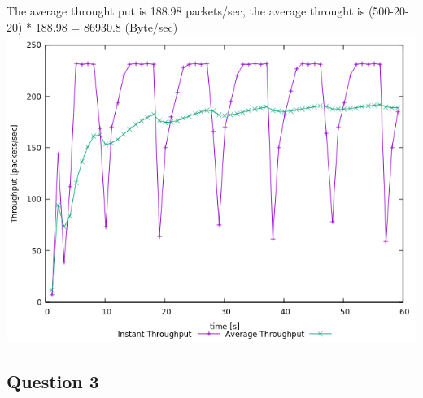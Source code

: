 \documentclass{article}
\begin{document}
The average throught put is 188.98 packets/sec, the average throught is (500-20-20) * 188.98 = 86930.8 (Byte/sec) \\
\includegraphics[width=\textwidth]{ex1q2.png}

\subsection{Question 3}
\end{document}
